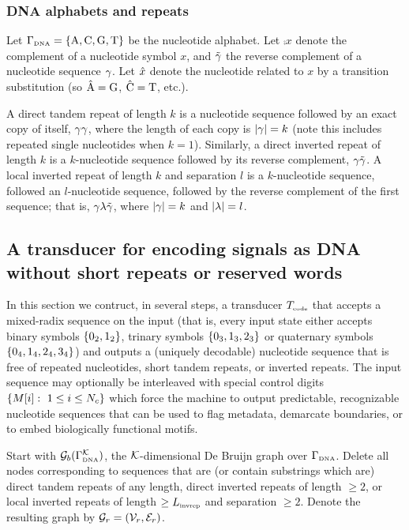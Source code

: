 \documentclass[english]{article}
\begin{document}
\subsubsection{DNA alphabets and repeats}

Let $\Gamma_{\mbox{\tiny DNA}} = \{ \mbox{A}, \mbox{C}, \mbox{G}, \mbox{T} \} $ be the nucleotide alphabet.
Let $\comp{x}$ denote the complement of a nucleotide symbol $x$,
and $\tilde{\gamma}$ the reverse complement of a nucleotide sequence $\gamma$.
Let $\hat{x}$ denote the nucleotide related to $x$ by a transition substitution
(so $\hat{\mbox{A}} = \mbox{G}$, $\hat{\mbox{C}}=\mbox{T}$, etc.).

A direct tandem repeat of length $k$ is a nucleotide sequence followed by an exact copy of itself, $\gamma \gamma$, where the length of each copy is $|\gamma|=k$
(note this includes repeated single nucleotides when $k=1$).
Similarly, a direct inverted repeat of length $k$ is a $k$-nucleotide sequence followed by its reverse complement, $\gamma \tilde{\gamma}$.
A local inverted repeat of length $k$ and separation $l$ is a $k$-nucleotide sequence, followed an $l$-nucleotide sequence, followed by the reverse complement
of the first sequence; that is, $\gamma \lambda \tilde{\gamma}$, where $|\gamma|=k$ and $|\lambda|=l$.

\subsection{A transducer for encoding signals as DNA without short repeats or reserved words}

In this section we contruct, in several steps, a transducer $T_{\mbox{\tiny code}}$
that accepts a mixed-radix sequence on the input
(that is, every input state either accepts binary symbols $\{ 0_2, 1_2 \}$,
trinary symbols $\{ 0_3, 1_3, 2_3 \}$ or
quaternary symbols $\{ 0_4, 1_4, 2_4, 3_4 \}$)
and outputs a (uniquely decodable) nucleotide sequence that is free of
repeated nucleotides, short tandem repeats, or inverted repeats.
The input sequence may optionally be interleaved with special control digits
$\{ M[{i}]:\ 1 \leq i \leq N_c \}$
which force the machine to output predictable, recognizable nucleotide sequences
that can be used to flag metadata, demarcate boundaries,
or to embed biologically functional motifs.

Start with ${\cal G}_b(\Gamma_{\mbox{\tiny DNA}}^{\cal K})$, the ${\cal K}$-dimensional De Bruijn graph over $\Gamma_{\mbox{\tiny DNA}}$.
Delete all nodes corresponding to sequences that are (or contain substrings which are)
direct tandem repeats of any length,
direct inverted repeats of length $\geq 2$,
or local inverted repeats of length $\geq L_{\mbox{\tiny invrep}}$ and separation $\geq 2$.
Denote the resulting graph by ${\cal G}_r = ({\cal V}_r,{\cal E}_r)$.
\end{document}

